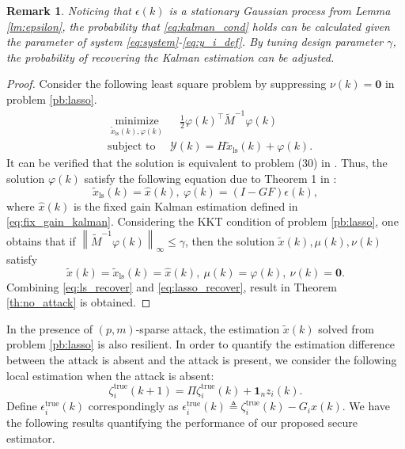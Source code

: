 \documentclass{ieeetrans}   %
\newcommand{\Yc}{{\mathcal{Y}}}
\newcommand{\ift}{{\infty}}
\newcommand{\ls}{\text{ls}}
\newcommand{\re}{\text{true}}
\newtheorem{remark}{\textbf{Remark}}
\newtheorem*{proof}{\textbf{Proof}}
\begin{document}
\begin{remark}
	Noticing that $\epsilon(k)$ is a stationary Gaussian process from Lemma \ref{lm:epsilon}, the probability that \eqref{eq:kalman_cond} holds can be calculated given the parameter of system \eqref{eq:system}-\eqref{eq:y_i_def}.
	By tuning design parameter $\gamma$, the probability of recovering the Kalman estimation can be adjusted.
\end{remark}
\begin{proof}
	Consider the following least square problem by suppressing $\nu(k)=\mathbf{0}$ in problem \eqref{pb:lasso}.
	\begin{subequations}\label{pb:least_square}
		\begin{align}
			&\underset{\tilde{x}_\ls (k), \varphi(k)}{\operatorname{minimize}}\quad\ \frac{1}{2} \varphi(k)^\top \tilde{M}^{-1} \varphi(k)   \\
			&\text{subject to }\quad
			\Yc(k)=H \tilde{x}_\ls(k) +\varphi(k). 
		\end{align}
	\end{subequations}
	It can be verified that the solution is equivalent to problem (30) in \cite{liuxinghua-TAC2020}.
	Thus, the solution $\varphi(k)$ satisfy the following equation due to Theorem 1 in \cite{liuxinghua-TAC2020}:
	\begin{equation}\label{eq:ls_recover}
		\tilde{x}_\ls(k)=\hat{x}(k),\ \varphi(k)=(I-GF)\epsilon(k),
	\end{equation}
	where $\hat{x}(k)$ is the fixed gain Kalman estimation defined in \eqref{eq:fix_gain_kalman}.
	Considering the KKT condition of problem \eqref{pb:lasso}, one obtains that if $\left\|\tilde{M}^{-1} \varphi(k)\right\|_\ift\leq\gamma$, then the solution $\tilde{x}(k),\mu(k),\nu(k)$ satisfy
	\begin{equation}\label{eq:lasso_recover}
	\tilde{x}(k)=\tilde{x}_\ls(k)=\hat{x}(k),\ \mu(k)=\varphi(k),\ \nu(k)=\mathbf{0}.
	\end{equation}
	Combining \eqref{eq:ls_recover} and \eqref{eq:lasso_recover}, result in Theorem \ref{th:no_attack} is obtained.
\end{proof}

In the presence of $(p,m)$-sparse attack, the estimation $\tilde{x}(k)$ solved from problem \eqref{pb:lasso} is also resilient. In order to quantify the estimation difference between the attack is absent and the attack is present, we consider the following local estimation when the attack is absent:
\begin{equation}\label{eq:def_zetare}
	\zeta^\re_i (k+1) = \Pi \zeta^\re_i (k) + \mathbf{1}_n z_i (k).
\end{equation}
Define $\epsilon^\re_{i}(k)$ correspondingly as $\epsilon^\re_{i}(k)\triangleq \zeta^\re_i(k)-G_ix(k)$.
We have the following results quantifying the performance of our proposed secure estimator.
\end{document}
